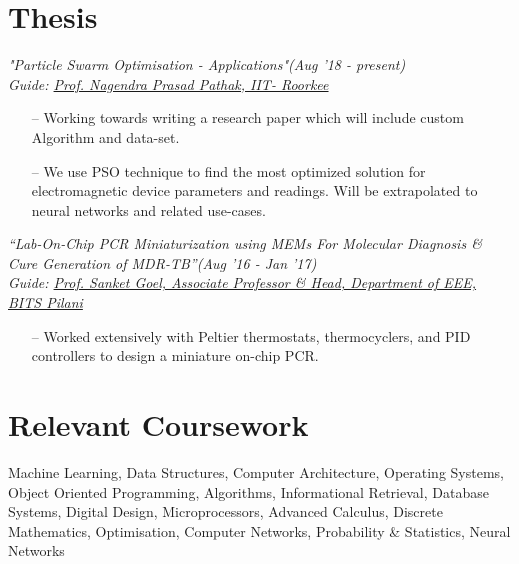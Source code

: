 \documentclass[margin,line]{templates/resume}
\newcommand{\myhref}[3][blue]{\href{#2}{\color{#1}{#3}}}
\newcommand{\compresslist}{%
\setlength{\itemsep}{3pt}%
\setlength{\parskip}{0pt}%
\setlength{\parsep}{0pt}%
}
\begin{document}
\begin{resume}
\section{\mysidestyle Thesis}
\textsf{\textit{"Particle Swarm Optimisation - Applications"}}\hfill\textit{\small(Aug '18 - present)}
\\ {\textit{Guide: \href{https://www.iitr.ac.in/centers/NT/pages/People+Faculty+Dr__Nagendra_Prasad_Pathak.html}{Prof. Nagendra Prasad Pathak, IIT- Roorkee}}} \hfill{\myhref[darkblue]{https://esha-singh.github.io/\#mpi}{Web}}
\vspace{0.05cm}
\begin{itemize}[leftmargin=*]\compresslist
\item[--]Working towards writing a research paper which will include custom Algorithm and data-set. 
\item[--]We use PSO technique to find the most optimized solution for electromagnetic device parameters and readings. Will be extrapolated to neural networks and related use-cases. 
\end{itemize}

\vspace{-0.2cm}    
\textsf{\textit{“Lab-On-Chip PCR Miniaturization using MEMs For Molecular Diagnosis \& Cure Generation of MDR-TB”}}\hfill\textit{\small(Aug '16 - Jan '17)}
\\ {\textit{Guide: \href{http://www.bits-pilani.ac.in/hyderabad/sgoel/profile}{ Prof. Sanket Goel, Associate Professor \& Head, Department of EEE, BITS Pilani}}}\hfill{\myhref[darkblue]{https://esha-singh.github.io/\#mpi}{Web}}
\normalsize
\vspace{0.05cm}
\begin{itemize}[leftmargin=*]\compresslist
    \item[--] Worked extensively with  Peltier thermostats, thermocyclers, and  PID controllers to design a miniature on-chip PCR.
   
\end{itemize}

\section{\mysidestyle Relevant Coursework} 
Machine Learning, Data Structures, Computer Architecture, Operating Systems, Object Oriented Programming, Algorithms,  Informational Retrieval, Database Systems, Digital Design, Microprocessors, Advanced Calculus, Discrete Mathematics, Optimisation, Computer Networks, Probability \& Statistics, Neural Networks


\end{resume}
\end{document}
